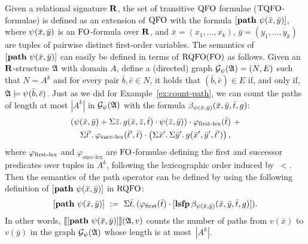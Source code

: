 Given a relational signature $\mathbf{R}$, the set of transitive ${\rm QFO}$ formulae (${\rm TQFO}$-formulae) is defined as an extension of ${\rm QFO}$ with the formula
$
[{\bf path} \,\, \psi(\bar{x},\bar{y})]
$, where $\psi(\bar{x}, \bar{y})$ is an ${\rm FO}$-formula over $\mathbf{R}$, and $\bar{x} = (x_1, \ldots, x_k)$, $\bar{y} = (y_1, \ldots, y_k)$ are tuples of pairwise distinct first-order variables. The semantics of $[{\bf path} \,\, \psi(\bar{x},\bar{y})]$ can easily be defined in terms of ${\rm RQFO}({\rm FO})$ as follows. 
Given an $\mathbf{R}$-structure $\mathfrak{A}$ with domain $A$, define a (directed) graph $\mathcal{G}_{\psi}(\mathfrak{A}) = (N,E)$ such that $N = A^k$ and for every pair $\bar b, \bar c \in N$, it holds that $(\bar b, \bar c) \in E$ if, and only if, $\mathfrak{A} \models \psi(\bar b, \bar c)$.
Just as we did for Example~\ref{ex:count-path}, we can count the paths of length at most $|A^k|$ in $ \mathcal{G}_{\psi}(\mathfrak{A})$ with the formula $\beta_{\psi(\bar{x},\bar{y})}(\bar{x}, \bar{y}, \bar{t}, g)$:
\begin{multline*}
(\psi(\bar{x},\bar{y}) + \Sigma{\bar{z}}.\, g(\bar{x},\bar{z},\bar{t})\cdot \psi(\bar{z},\bar{y})) \cdot \varphi_{\text{\rm first-lex}}(\bar{t}) \ +\\
\Sigma{\bar{t}'}.\, \varphi_{\text{succ-lex}}(\bar{t}',\bar{t}) \cdot \left(\Sigma{\bar{x}'}.\, \Sigma{\bar{y}'}.\, g(\bar{x}',\bar{y}',\bar{t}') \right),
\end{multline*}
where $\varphi_{\text{\rm first-lex}}$ and $\varphi_{\text{succ-lex}}$ are ${\rm FO}$-formulae defining the first and successor predicates over tuples in $A^k$, following the lexicographic order induced by~$<$.
Then the semantics of the path operator can be defined by using the following definition of $[{\bf path} \,\, \psi(\bar{x},\bar{y})]$ in ${\rm RQFO}$:
\[
[{\bf path} \,\, \psi(\bar{x}, \bar{y})] \ :=\ \Sigma{\bar{t}}.\, (\varphi_{\text{\rm first}}(\bar{t}) \cdot [{\bf lsfp} \, \beta_{\psi(\bar{x},\bar{y})}(\bar{x},\bar{y},\bar{t},g)]).
\]
In other words, ${\llbracket{}{[{\bf path} \,\, \psi(\bar{x}, \bar{y})]}\rrbracket}(\mathfrak{A},v)$ counts the number of paths from $v(\bar x)$ to $v(\bar y)$ in the graph $\mathcal{G}_{\psi}(\mathfrak{A})$ whose length is at most~$|A^k|$.

